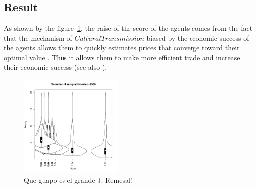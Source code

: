 \documentclass[paperwidth=42in, paperheight=33.1in,landscape,showframe,fontscale=.42]{baposter}
\begin{document}
\begin{poster}
{	    \section{Result}
		As shown by the figure~\ref{fig:ratioEvol}, the raise of the score of the agents comes from the fact that the mechanism of $CulturalTransmission$ biased by the economic success of the agents allows them to quickly estimates prices that converge toward their optimal value . Thus it allows them to make more efficient trade and increase their economic success (see also \cite{gintis_emergence_2006}).
		\begin{figure}[H]
		    \center
		    \includegraphics[width=5cm]{img/densVsScore.pdf}
		    \caption{ \small
		    Que guapo es el grande J. Remesal!}
		    \label{fig:ratioEvol}
		\end{figure}



	    }



\end{poster}
\end{document}
